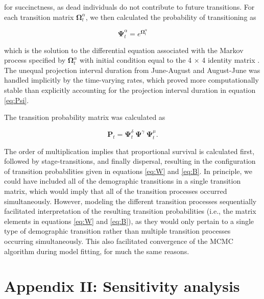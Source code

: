 \documentclass[11pt]{article}
\begin{document}
for succinctness, as dead individuals do not contribute to future transitions.
For each transition matrix $\mathbf{\Omega}^{\alpha}_t$, 
we then calculated the probability of transitioning as
%
\begin{linenomath*}
\begin{equation} \label{eq:Psi}
\mathbf{\Psi}^{\alpha}_t = e^{\mathbf{\Omega}^{\alpha}_t}
\end{equation}
\end{linenomath*}
%
which is the solution to the differential equation associated with the Markov process
specified by $\mathbf{\Omega}^{\alpha}_t$ 
with initial condition equal to the 4 $\times$ 4 identity matrix
\citep{yang2006computational}.
The unequal projection interval duration from June-August and August-June was handled 
implicitly by the time-varying rates, 
which proved more computationally stable than explicitly accounting for the projection
interval duration in equation \ref{eq:Psi}.

The transition probability matrix was calculated as 
%
\begin{linenomath*}
\begin{equation} \label{eq:POmega}
\mathbf{P}_{t} = \mathbf{\Psi}^{\delta}_t~\mathbf{\Psi}^{\gamma}~\mathbf{\Psi}^{\mu}_t.
\end{equation}
\end{linenomath*}
%
The order of multiplication implies that proportional survival is calculated first,
followed by stage-transitions, and finally dispersal,
resulting in the configuration of transition probabilities
given in equations \ref{eq:W} and \ref{eq:B}.
In principle, we could have included all of the demographic transitions in a single
transition matrix,
which would imply that all of the transition processes occurred simultaneously. 
However, modeling the different transition processes sequentially facilitated interpretation
of the resulting transition probabilities 
(i.e., the matrix elements in equations \ref{eq:W} and \ref{eq:B}), 
as they would only pertain to a single type of demographic transition
rather than multiple transition processes occurring simultaneously.
This also facilitated convergence of the MCMC algorithm during model fitting, 
for much the same reasons.


\newpage{}

\section*{Appendix II: Sensitivity analysis} 
\end{document}

